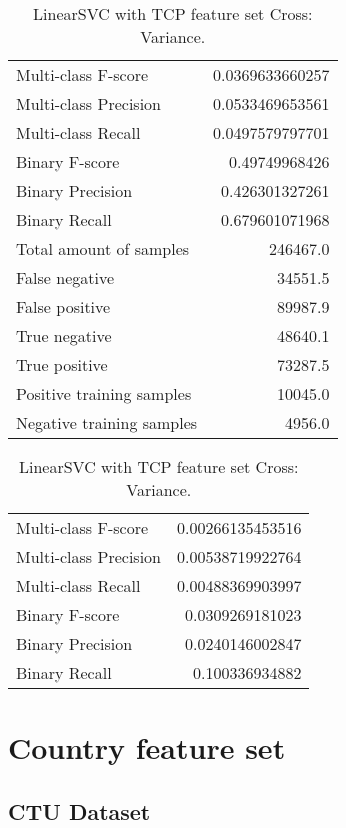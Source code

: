 \begin{table}[H]
\begin{minipage}{0.5\textwidth}
\caption{LinearSVC with TCP feature set Cross: Average.}
\centering
\begin{tabular}{l r}
\toprule
Multi-class F-score & 0.0369633660257 \\
Multi-class Precision & 0.0533469653561 \\
Multi-class Recall & 0.0497579797701 \\
\midrule
Binary F-score & 0.49749968426 \\
Binary Precision & 0.426301327261 \\
Binary Recall & 0.679601071968 \\
\midrule
Total amount of samples & 246467.0 \\
False negative & 34551.5 \\
False positive & 89987.9 \\
True negative & 48640.1 \\
True positive & 73287.5 \\
\midrule
Positive training samples & 10045.0 \\
Negative training samples & 4956.0 \\
\bottomrule
\end{tabular}
\end{minipage}
\hfillx
\begin{minipage}{0.5\textwidth}
\caption{LinearSVC with TCP feature set Cross: Variance.}
\centering
\begin{tabular}{l r}
\toprule
Multi-class F-score & 0.00266135453516 \\
Multi-class Precision & 0.00538719922764 \\
Multi-class Recall & 0.00488369903997 \\
\midrule
Binary F-score & 0.0309269181023 \\
Binary Precision & 0.0240146002847 \\
Binary Recall & 0.100336934882 \\
\bottomrule
\end{tabular}
\end{minipage}
\end{table}

\newpage
\section{Country feature set}
\subsection{CTU Dataset}

